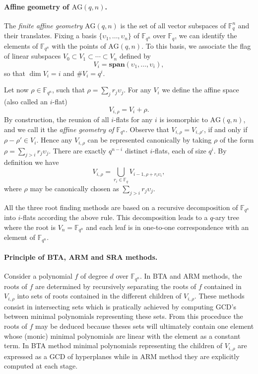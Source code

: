 \documentclass{article}
\newcommand{\ff}[1]{\mathbb{F}_{#1}}
\newcommand{\dd}{d}
\newcommand{\qq}{q}
\newcommand{\nn}{n}
\newcommand{\qn}{{\qq^\nn}}
\newcommand{\basef}{\ff{\qq}}
\newcommand{\extf}{\ff{\qn}}
\newcommand{\AG}{\mathrm{AG}(\qq,\nn)}
\newcommand{\Span}{\mathbf{span}}
\newcommand{\card}[1]{\# #1}
\begin{document}
\paragraph{Affine geometry of $\AG$.} The \emph{finite affine geometry} $\AG$ is the set of all vector subspaces of $\basef^\nn$ and their translates. Fixing a basis $\{\upsilon_1,\ldots,\upsilon_\nn\}$ of $\extf$ over $\basef$, we can
identify the elements of $\extf$ with the points of $\AG$. To this basis, we associate the flag of linear
subspaces $V_0\subset V_1\subset \cdots \subset V_\nn$ defined by
\begin{equation}
  V_i = \Span(\upsilon_1,\dots,\upsilon_i),
\end{equation}
so that $\dim V_i = i$ and $\card V_i = \qq^i$.

Let now $\rho\in\extf$, such that $\rho=\sum_j r_j\upsilon_j$.  For any
$V_i$ we define the affine space (also called an $i$-flat)
\begin{equation}
  V_{i,\rho} = V_i + \rho.
\end{equation}
By construction, the reunion of all $i$-flats for any $i$ is
isomorphic to $\AG$, and we call it the \emph{affine geometry of
  $\extf$}.
Observe that $V_{i,\rho}=V_{i,\rho'}$, if and only if $\rho-\rho'\in V_i$. Hence
any $V_{i,\rho}$ can be represented canonically by taking $\rho$ of
the form $\rho=\sum_{j>i}r_j\upsilon_j$. There are exactly
$\qq^{n-i}$ distinct $i$-flats, each of size $\qq^i$. By definition we have
\begin{equation}
  V_{i,\rho} = \bigcup_{r_i \in\basef} V_{i-1,\rho + r_i \upsilon_i},
\end{equation}
where $\rho$ may be canonically chosen as $\sum_{j>i}r_j\upsilon_j$.

\medskip

\noindent All the three root finding methods are based on a recursive decomposition of $\extf$ into $i$-flats 
according the above rule. This decomposition leads to a $\qq$-ary tree where the root 
is $V_{n}=\extf$ and each leaf is in one-to-one correspondence with an element of $\extf$.

\medskip

\paragraph{Principle of BTA, ARM and SRA methods.} Consider a polynomial $f$ of degree $\dd$ over $\extf$. In BTA and ARM methods, the roots of $f$ are determined by recursively separating the roots of $f$ contained in $V_{i,\rho}$ into sets of roots contained in the different children of $V_{i,\rho}$. These methods consist in intersecting sets which is pratically achieved by computing GCD's between minimal polynomials representing these sets. From this proceduce the roots of $f$ may be deduced because 
theses sets will ultimately contain one element whose (monic) minimal polynomials are linear with the element as a constant term. In BTA method minimal polynomials representing the children of $V_{i,\rho}$ 
are expressed as a GCD of hyperplanes while in ARM method they are explicitly computed at each stage.
\end{document}

